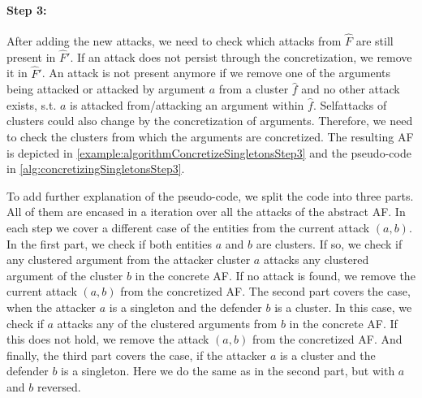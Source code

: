 \paragraph{Step 3:} After adding the new attacks, we need to check which attacks from $\hat{F}$ are still present in $\hat{F}'$. If an attack does not persist through the concretization, we remove it in $\hat{F}'$. An attack is not present anymore if we remove one of the arguments being attacked or attacked by argument $a$ from a cluster $\hat{f}$ and no other attack exists, s.t. $a$ is attacked from/attacking an argument within $\hat{f}$. Selfattacks of clusters could also change by the concretization of arguments. Therefore, we need to check the clusters from which the arguments are concretized. The resulting AF is depicted in \cref{example:algorithmConcretizeSingletonsStep3} and the pseudo-code in \cref{alg:concretizingSingletonsStep3}.

To add further explanation of the pseudo-code, we split the code into three parts. All of them are encased in a iteration over all the attacks of the abstract AF. In each step we cover a different case of the entities from the current attack $(a, b)$.
In the first part, we check if both entities $a$ and $b$ are clusters. If so, we check if any clustered argument from the attacker cluster $a$ attacks any clustered argument of the cluster $b$ in the concrete AF. If no attack is found, we remove the current attack $(a, b)$ from the concretized AF.
The second part covers the case, when the attacker $a$ is a singleton and the defender $b$ is a cluster. In this case, we check if $a$ attacks any of the clustered arguments from $b$ in the concrete AF. If this does not hold, we remove the attack $(a, b)$ from the concretized AF.
And finally, the third part covers the case, if the attacker $a$ is a cluster and the defender $b$ is a singleton. Here we do the same as in the second part, but with $a$ and $b$ reversed.


